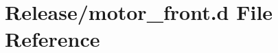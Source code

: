 \hypertarget{motor__front_8d}{}\section{Release/motor\+\_\+front.d File Reference}
\label{motor__front_8d}
